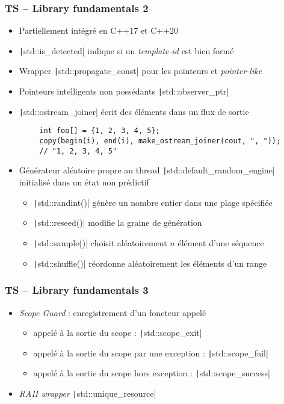 \documentclass[C++.tex]{subfiles}
\begin{document}
\begin{frame}[fragile]
	\frametitle{TS -- Library fundamentals 2}
	\begin{itemize}
		\item Partiellement intégré en C++17 et C++20
		\item \texttt|std::is_detected| indique si un \textit{template-id} est bien formé
		\item Wrapper \texttt|std::propagate_const| pour les pointeurs et \textit{pointer-like}
		\item Pointeurs intelligents non possédants \texttt|std::observer_ptr|
		\item \texttt|std::ostream_joiner| écrit des éléments dans un flux de sortie
	\end{itemize}

	\begin{verbatim}
		int foo[] = {1, 2, 3, 4, 5};
		copy(begin(i), end(i), make_ostream_joiner(cout, ", ")); 
		// "1, 2, 3, 4, 5"
	\end{verbatim}

	\begin{itemize}
		\item Générateur aléatoire propre au thread \texttt|std::default_random_engine| initialisé dans un état non prédictif
		\begin{itemize}
			\item \texttt|std::randint()| génère un nombre entier dans une plage spécifiée
			\item \texttt|std::reseed()| modifie la graine de génération
			\item \texttt|std::sample()| choisit aléatoirement $n$ élément d'une séquence
			\item \texttt|std::shuffle()| réordonne aléatoirement les éléments d'un range
		\end{itemize}
	\end{itemize}
\end{frame}

\begin{frame}[fragile]
	\frametitle{TS -- Library fundamentals 3}
	\begin{itemize}
		\item \textit{Scope Guard} : enregistrement d'un foncteur appelé
		\begin{itemize}
			\item appelé à la sortie du scope : \texttt|std::scope_exit|
			\item appelé à la sortie du scope par une exception : \texttt|std::scope_fail|
			\item appelé à la sortie du scope hors exception : \texttt|std::scope_success|
		\end{itemize}
		\item \textit{RAII wrapper} \texttt|std::unique_resource|
	\end{itemize}
\end{frame}
\end{document}
